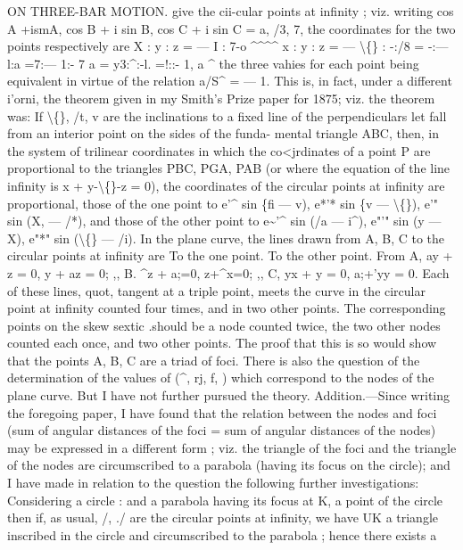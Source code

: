 \documentclass[11pt,a4paper]{book}
\begin{document}
ON THREE-BAR MOTION.
give the
cii-cular points at
infinity
;
viz. writing
cos A +ismA, cos B + i sin B,
cos C + i sin C = a,
/3,
7,
the coordinates
for the two points respectively are
X
: y
: z = --- I
:
7-o
\textasciicircum{}\textasciicircum{}\textasciicircum{}\textasciicircum{}
x
: y
:
z = --- \textbackslash\{\}
:
-:/8
=
-:--- l:a
=7:--- 1:-
7
a
=
y3:\textasciicircum{}:-l.
=!:\guillemotleft{}:- 1,
a
\textasciicircum{}
the
three
vahies
for
each
point
being
equivalent
in
virtue
of
the
relation
a/S\textasciicircum{} = --- 1.
This
is,
in
fact,
under
a
different
i'orni,
the
theorem
given
in
my
Smith's
Prize
paper
for
1875;
viz.
the
theorem
was:
If
\textbackslash\{\},
/t,
v
are
the
inclinations
to
a
fixed
line
of
the
perpendiculars
let
fall
from
an
interior
point
on
the
sides
of
the
funda-
mental
triangle
ABC,
then,
in
the
system
of
trilinear
coordinates
in
which
the
co<jrdinates
of
a
point P
are
proportional
to
the
triangles
PBC, PGA, PAB
(or
where
the
equation
of
the
line
infinity
is x + y-\textbackslash\{\}-z = 0),
the
coordinates of the
circular
points at
infinity
are
proportional,
those
of the
one
point
to
e'\textasciicircum{} sin \{fi --- v),
e*'* sin \{v --- \textbackslash\{\}),
e'" sin (X, --- /*), and
those of the other point
to
e\textasciitilde{}'\textasciicircum{} sin (/a --- i\textasciicircum{}),
e"'" sin (y --- X),
e"*" sin (\textbackslash\{\} --- /i).
In
the
plane
curve,
the
lines
drawn
from
A,
B, C
to
the
circular
points
at
infinity are
To the one
point.
To the other
point.
From A,
ay + z = 0,
y + az = 0;
,,
B.
\textasciicircum{}z + a;=0,
z+\textasciicircum{}x=0;
,,
C,
yx + y = 0,
a;+'yy = 0.
Each
of
these
lines,
quot,
tangent
at
a
triple
point,
meets
the
curve
in
the
circular
point
at
infinity
counted
four
times,
and
in
two
other
points.
The
corresponding
points
on
the
skew
sextic
.should
be
a
node
counted
twice,
the
two
other
nodes
counted
each
once,
and
two
other
points.
The
proof
that
this
is
so
would
show
that
the
points
A,
B, C
are
a
triad
of
foci.
There
is
also
the
question
of
the
determination
of
the
values
of
(\textasciicircum{},
rj,
f,
\guillemotleft{})
which
correspond
to
the
nodes
of
the
plane
curve.
But
I have not further pursued the
theory.
Addition.---Since
writing
the
foregoing
paper,
I
have
found
that
the
relation
between
the
nodes
and
foci
(sum
of angular
distances
of
the
foci = sum
of angular
distances
of
the
nodes)
may
be
expressed
in
a
different
form
;
viz.
the
triangle
of
the
foci
and
the
triangle
of
the
nodes
are
circumscribed
to
a
parabola
(having
its
focus
on
the
circle);
and
I
have
made
in
relation
to
the
question
the
following
further investigations:
Considering a
circle
:
and
a
parabola having
its
focus
at K, a
point
of the
circle
then
if,
as
usual,
/,
./
are
the
circular
points
at
infinity,
we
have UK
a
triangle
inscribed
in
the
circle
and
circumscribed
to
the
parabola
;
hence
there
exists
a
\end{document}
